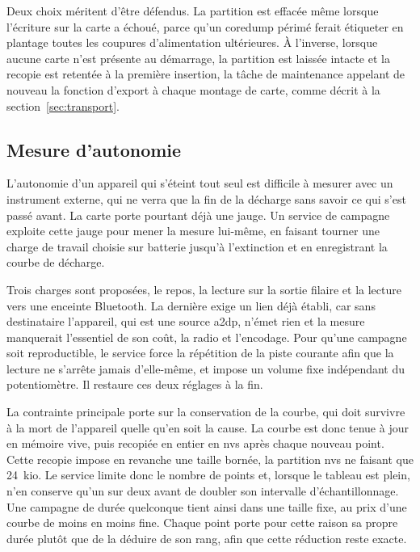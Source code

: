 Deux choix méritent d'être défendus. La partition est effacée même lorsque l'écriture sur la carte a échoué, parce qu'un \gls{coredump} périmé ferait étiqueter en plantage toutes les coupures d'alimentation ultérieures. À l'inverse, lorsque aucune carte n'est présente au démarrage, la partition est laissée intacte et la recopie est retentée à la première insertion, la tâche de maintenance appelant de nouveau la fonction d'export à chaque montage de carte, comme décrit à la section~\ref{sec:transport}.

\subsection{Mesure d'autonomie}

L'autonomie d'un appareil qui s'éteint tout seul est difficile à mesurer avec un instrument externe, qui ne verra que la fin de la décharge sans savoir ce qui s'est passé avant. La carte porte pourtant déjà une jauge. Un service de campagne exploite cette jauge pour mener la mesure lui-même, en faisant tourner une charge de travail choisie sur batterie jusqu'à l'extinction et en enregistrant la courbe de décharge.

Trois charges sont proposées, le repos, la lecture sur la sortie filaire et la lecture vers une enceinte Bluetooth. La dernière exige un lien déjà établi, car sans destinataire l'appareil, qui est une source \gls{a2dp}, n'émet rien et la mesure manquerait l'essentiel de son coût, la radio et l'encodage. Pour qu'une campagne soit reproductible, le service force la répétition de la piste courante afin que la lecture ne s'arrête jamais d'elle-même, et impose un volume fixe indépendant du potentiomètre. Il restaure ces deux réglages à la fin.

La contrainte principale porte sur la conservation de la courbe, qui doit survivre à la mort de l'appareil quelle qu'en soit la cause. La courbe est donc tenue à jour en mémoire vive, puis recopiée en entier en \gls{nvs} après chaque nouveau point. Cette recopie impose en revanche une taille bornée, la partition \gls{nvs} ne faisant que 24~kio. Le service limite donc le nombre de points et, lorsque le tableau est plein, n'en conserve qu'un sur deux avant de doubler son intervalle d'échantillonnage. Une campagne de durée quelconque tient ainsi dans une taille fixe, au prix d'une courbe de moins en moins fine. Chaque point porte pour cette raison sa propre durée plutôt que de la déduire de son rang, afin que cette réduction reste exacte.

